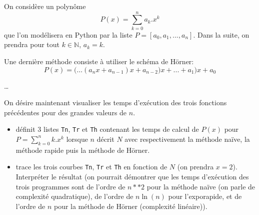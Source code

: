 	


	\bigskip On considère un polynôme $$P(x)=\displaystyle\sum_{k=0}^n a_k.x^k$$ que l'on modélisera en Python par la liste $P=[a_0,a_1,...,a_n]$. Dans la suite, on prendra pour tout $k\in\mathbb{N}$, $a_k=k$.



	

	\bigskip Une dernière méthode consiste à utiliser le schéma de Hörner:
	\[P(x)= (\ldots{(a_nx+a_{n-1})x+a_{n-2})x+...+a_1)x+a_0}\]


\ldots




	\bigskip On désire maintenant visualiser les temps d'exécution des trois fonctions précédentes pour des grandes valeurs de $n$.


\begin{itemize}
\item définit 3 listes \texttt{Tn}, \texttt{Tr} et \texttt{Th} contenant les temps de calcul de $P(x)$ pour $P=\displaystyle\sum_{k=0}^n k.x^k$ lorsque $n$ décrit $N$ avec respectivement la méthode naïve, la méthode rapide puis la méthode de Hörner.\\
\item trace les trois courbes  \texttt{Tn}, \texttt{Tr} et \texttt{Th} en fonction de $N$ (on prendra $x=2$). Interpréter le résultat (on pourrait démontrer que les temps d'exécution des trois programmes sont de l'ordre de $n**2$ pour la méthode naïve (on parle de complexité quadratique), de l'ordre de $n\ln(n)$ pour l'exporapide, et de l'ordre de $n$ pour la méthode de Hörner (complexité linéaire)). 
\end{itemize}
	
